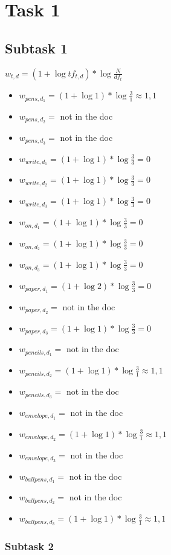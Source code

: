 \documentclass[a4paper]{scrartcl}
\begin{document}
    
\section*{Task 1}
\subsection{Subtask 1}
\begin{center}
    $w_{t,d}=(1+\log tf_{t,d})*\log \frac{N}{df_t}$
\end{center}
\begin{itemize}
    \item $w_{pens, d_1} = (1+\log 1) * \log \frac{3}{1} \approx  1,1$
    \item $w_{pens, d_2} = $ not in the doc
    \item $w_{pens, d_3} = $ not in the doc
    \item $w_{write, d_1} = (1+\log 1) * \log \frac{3}{3} = 0$
    \item $w_{write, d_2} = (1+\log 1) * \log \frac{3}{3} = 0$
    \item $w_{write, d_3} = (1+\log 1) * \log \frac{3}{3} = 0$
    \item $w_{on, d_1} = (1+\log 1) * \log \frac{3}{3} = 0$
    \item $w_{on, d_2} = (1+\log 1) * \log \frac{3}{3} = 0$
    \item $w_{on, d_3} = (1+\log 1) * \log \frac{3}{3} = 0$
    \item $w_{paper, d_1} = (1+\log 2) * \log \frac{3}{3} = 0$
    \item $w_{paper, d_2} = $ not in the doc
    \item $w_{paper, d_3} = (1+\log 1) * \log \frac{3}{3} = 0$
    \item $w_{pencils, d_1} = $ not in the doc
    \item $w_{pencils, d_2} = (1+\log 1) * \log \frac{3}{1} \approx 1,1$
    \item $w_{pencils, d_3} = $ not in the doc
    \item $w_{envelope, d_1} = $ not in the doc
    \item $w_{envelope, d_2} = (1+\log 1) * \log \frac{3}{1} \approx 1,1$
    \item $w_{envelope, d_3} = $ not in the doc
    \item $w_{ballpens, d_1} = $ not in the doc
    \item $w_{ballpens, d_2} = $ not in the doc
    \item $w_{ballpens, d_3} = (1+\log 1) * \log \frac{3}{1} \approx 1,1$
\end{itemize}

\subsubsection*{Subtask 2}
\end{document}
